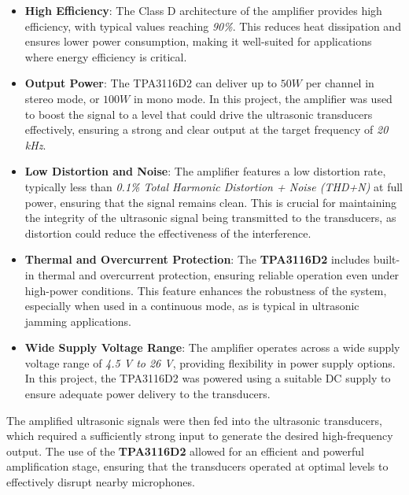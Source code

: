 \begin{itemize}
    \item \textbf{High Efficiency}: The Class D architecture of the amplifier provides high efficiency, with typical values reaching \textit{90\%}. This reduces heat dissipation and ensures lower power consumption, making it well-suited for applications where energy efficiency is critical.
    
    \item \textbf{Output Power}: The TPA3116D2 can deliver up to $50 W$ per channel in stereo mode, or $100 W$ in mono mode. In this project, the amplifier was used to boost the signal to a level that could drive the ultrasonic transducers effectively, ensuring a strong and clear output at the target frequency of \textit{20 kHz}.
    
    \item \textbf{Low Distortion and Noise}: The amplifier features a low distortion rate, typically less than \textit{0.1\% Total Harmonic Distortion + Noise (THD+N)} at full power, ensuring that the signal remains clean. This is crucial for maintaining the integrity of the ultrasonic signal being transmitted to the transducers, as distortion could reduce the effectiveness of the interference.
    
    \item \textbf{Thermal and Overcurrent Protection}: The \textbf{TPA3116D2} includes built-in thermal and overcurrent protection, ensuring reliable operation even under high-power conditions. This feature enhances the robustness of the system, especially when used in a continuous mode, as is typical in ultrasonic jamming applications.
    
    \item \textbf{Wide Supply Voltage Range}: The amplifier operates across a wide supply voltage range of \textit{4.5 V to 26 V}, providing flexibility in power supply options. In this project, the TPA3116D2 was powered using a suitable DC supply to ensure adequate power delivery to the transducers.
    
\end{itemize}

The amplified ultrasonic signals were then fed into the ultrasonic transducers, which required a sufficiently strong input to generate the desired high-frequency output. The use of the \textbf{TPA3116D2} allowed for an efficient and powerful amplification stage, ensuring that the transducers operated at optimal levels to effectively disrupt nearby microphones.


